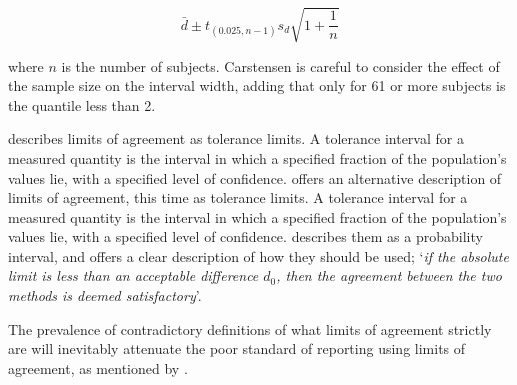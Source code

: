 \documentclass[12pt, a4paper]{report}
\theoremstyle{plain}
\theoremstyle{definition}
\theoremstyle{remark}
\begin{document}
\[
\bar{d} \pm t_{(0.025, n-1)}s_{d} \sqrt{1+\frac{1}{n}}
\]

\noindent where $n$ is the number of subjects. Carstensen is careful to consider the effect of the sample size on the interval
width, adding that only for 61 or more subjects is the quantile less than 2.

\citet{luiz} describes limits of agreement as tolerance limits. A
tolerance interval for a measured quantity is the interval in
which a specified fraction of the population's values lie, with a
specified level of confidence. \citet{luiz} offers an alternative description of limits of agreement, this time as tolerance limits. A tolerance interval for a measured quantity is the interval in which a specified fraction of the population's values lie, with a specified level of confidence. \citet{Barnhart} describes them as a probability interval, and offers a clear description of how they should be used; `\textit{if the absolute limit is less than an acceptable difference $d_{0}$, then the agreement between the two methods is deemed satisfactory}'.

The prevalence of contradictory definitions of what limits of agreement strictly are will inevitably attenuate the poor standard of reporting using limits of agreement, as mentioned by \citet{mantha}.





\end{document}
